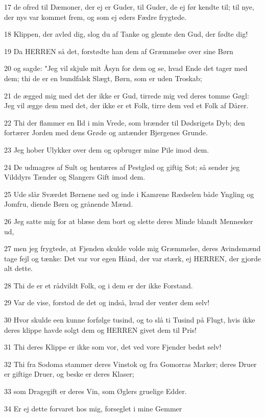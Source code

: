 \par 17 de ofred til Dæmoner, der ej er Guder, til Guder, de ej før kendte til; til nye, der nys var kommet frem, og som ej eders Fædre frygtede.
\par 18 Klippen, der avled dig, slog du af Tanke og glemte den Gud, der fødte dig!
\par 19 Da HERREN så det, forstødte han dem af Græmmelse over sine Børn
\par 20 og sagde: "Jeg vil skjule mit Åsyn for dem og se, hvad Ende det tager med dem; thi de er en bundfalsk Slægt, Børn, som er uden Troskab;
\par 21 de ægged mig med det der ikke er Gud, tirrede mig ved deres tomme Gøgl: Jeg vil ægge dem med det, der ikke er et Folk, tirre dem ved et Folk af Dårer.
\par 22 Thi der flammer en Ild i min Vrede, som brænder til Dødsrigets Dyb; den fortærer Jorden med dens Grøde og antænder Bjergenes Grunde.
\par 23 Jeg hober Ulykker over dem og opbruger mine Pile imod dem.
\par 24 De udmagres af Sult og hentæres af Pestglød og giftig Sot; så sender jeg Vilddyrs Tænder og Slangers Gift imod dem.
\par 25 Ude slår Sværdet Børnene ned og inde i Kamrene Rædselen både Yngling og Jomfru, diende Børn og grånende Mænd.
\par 26 Jeg satte mig for at blæse dem bort og slette deres Minde blandt Mennesker ud,
\par 27 men jeg frygtede, at Fjenden skulde volde mig Græmmelse, deres Avindsmænd tage fejl og tænke: Det var vor egen Hånd, der var stærk, ej HERREN, der gjorde alt dette.
\par 28 Thi de er et rådvildt Folk, og i dem er der ikke Forstand.
\par 29 Var de vise, forstod de det og indså, hvad der venter dem selv!
\par 30 Hvor skulde een kunne forfølge tusind, og to slå ti Tusind på Flugt, hvis ikke deres klippe havde solgt dem og HERREN givet dem til Pris!
\par 31 Thi deres Klippe er ikke som vor, det ved vore Fjender bedst selv!
\par 32 Thi fra Sodoma stammer deres Vinstok og fra Gomorras Marker; deres Druer er giftige Druer, og beske er deres Klaser;
\par 33 som Dragegift er deres Vin, som Øglers gruelige Edder.
\par 34 Er ej dette forvaret hos mig, forseglet i mine Gemmer
